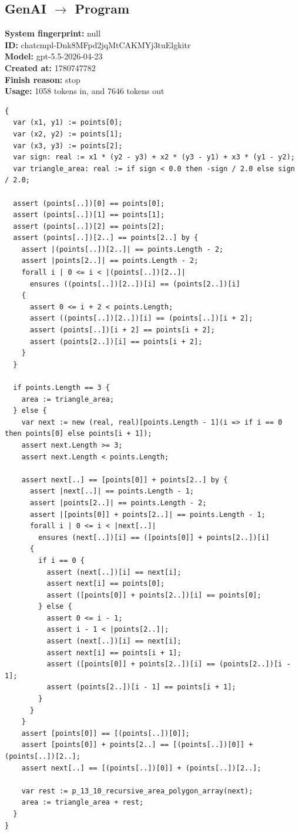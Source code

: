 \documentclass{article}
\begin{document}
\subsection*{GenAI $\rightarrow$ Program}
\textbf{System fingerprint: }null
\\\textbf{ID: }chatcmpl-Dnk8MFpd2jqMtCAKMYj3tuElgkitr
\\\textbf{Model: }gpt-5.5-2026-04-23
\\\textbf{Created at: }1780747782
\\\textbf{Finish reason: }stop
\\\textbf{Usage: }1058 tokens in, and 7646 tokens out
\begin{lstlisting}
{
  var (x1, y1) := points[0];
  var (x2, y2) := points[1];
  var (x3, y3) := points[2];
  var sign: real := x1 * (y2 - y3) + x2 * (y3 - y1) + x3 * (y1 - y2);
  var triangle_area: real := if sign < 0.0 then -sign / 2.0 else sign / 2.0;

  assert (points[..])[0] == points[0];
  assert (points[..])[1] == points[1];
  assert (points[..])[2] == points[2];
  assert (points[..])[2..] == points[2..] by {
    assert |(points[..])[2..]| == points.Length - 2;
    assert |points[2..]| == points.Length - 2;
    forall i | 0 <= i < |(points[..])[2..]|
      ensures ((points[..])[2..])[i] == (points[2..])[i]
    {
      assert 0 <= i + 2 < points.Length;
      assert ((points[..])[2..])[i] == (points[..])[i + 2];
      assert (points[..])[i + 2] == points[i + 2];
      assert (points[2..])[i] == points[i + 2];
    }
  }

  if points.Length == 3 {
    area := triangle_area;
  } else {
    var next := new (real, real)[points.Length - 1](i => if i == 0 then points[0] else points[i + 1]);
    assert next.Length >= 3;
    assert next.Length < points.Length;

    assert next[..] == [points[0]] + points[2..] by {
      assert |next[..]| == points.Length - 1;
      assert |points[2..]| == points.Length - 2;
      assert |[points[0]] + points[2..]| == points.Length - 1;
      forall i | 0 <= i < |next[..]|
        ensures (next[..])[i] == ([points[0]] + points[2..])[i]
      {
        if i == 0 {
          assert (next[..])[i] == next[i];
          assert next[i] == points[0];
          assert ([points[0]] + points[2..])[i] == points[0];
        } else {
          assert 0 <= i - 1;
          assert i - 1 < |points[2..]|;
          assert (next[..])[i] == next[i];
          assert next[i] == points[i + 1];
          assert ([points[0]] + points[2..])[i] == (points[2..])[i - 1];
          assert (points[2..])[i - 1] == points[i + 1];
        }
      }
    }
    assert [points[0]] == [(points[..])[0]];
    assert [points[0]] + points[2..] == [(points[..])[0]] + (points[..])[2..];
    assert next[..] == [(points[..])[0]] + (points[..])[2..];

    var rest := p_13_10_recursive_area_polygon_array(next);
    area := triangle_area + rest;
  }
}
\end{lstlisting}
\end{document}

